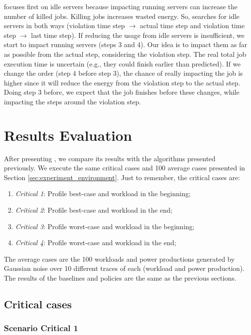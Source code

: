 \emph{\systemName} focuses first on idle servers because impacting running servers can increase the number of killed jobs. Killing jobs increases wasted energy. So, \emph{\systemName} searches for idle servers in both ways (violation time step $\rightarrow$ actual time step and violation time step $\rightarrow$ last time step). If reducing the usage from idle servers is insufficient, we start to impact running servers (steps 3 and 4). Our idea is to impact them as far as possible from the actual step, considering the violation step. The real total job execution time is uncertain (e.g., they could finish earlier than predicted). If we change the order (step 4 before step 3), the chance of really impacting the job is higher since it will reduce the energy from the violation step to the actual step. Doing step 3 before, we expect that the job finishes before these changes, while impacting the steps around the violation step. 

\section{Results Evaluation}

After presenting \emph{\systemName}, we compare its results with the algorithms presented previously. We execute the same critical cases and 100 average cases presented in Section \ref{sec:experiment_environment}. Just to remember, the critical cases are:
\begin{enumerate}
    \item \emph{Critical 1}: Profile best-case and workload in the beginning;
    \item \emph{Critical 2}: Profile best-case and workload in the end;
    \item \emph{Critical 3}: Profile worst-case and workload in the beginning;
    \item \emph{Critical 4}: Profile worst-case and workload in the end;
\end{enumerate}

The average cases are the 100 workloads and power productions generated by Gaussian noise over 10 different traces of each (workload and power production). The results of the baselines and policies are the same as the previous sections.

\subsection{Critical cases}

\subsubsection{Scenario Critical 1}


